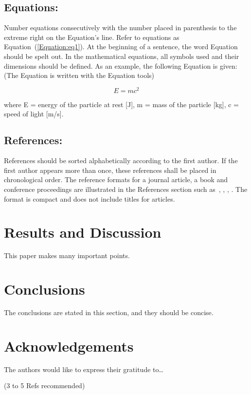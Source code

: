 \documentclass[nouppercase]{ifmbe}
\begin{document}
\subsection{Equations:} Number equations consecutively with the number placed in parenthesis to the extreme right on the Equation’s line. Refer to equations as Equation~(\ref{Equation:eq1}). At the beginning of a sentence, the word Equation should be spelt out. In the mathematical equations, all symbols used and their dimensions should be defined. As an example, the following Equation is given: (The Equation is written with the Equation tools)

\begin{equation}\label{Equation:eq1}
E = mc^2
\end{equation}

where
E = energy of the particle at rest [J],
m = mass of the particle [kg],
c = speed of light [m/s].

\subsection{References:} References should be sorted alphabetically according to the first author. If the first author appears more than once, these references shall be placed in chronological order. 
The reference formats for a journal article, a book and conference proceedings are illustrated in the References section such as~\cite{IFMBE}, \cite{smith99}, \cite{lock03}, \cite{south01}. The format is compact and does not include titles for articles. 

\section{Results and Discussion}
This paper makes many important points.

\section{Conclusions}
The conclusions are stated in this section, and they should be concise.

\section*{Acknowledgements}
The authors would like to express their gratitude to…


(3 to 5 Refs recommended)
\end{document}
